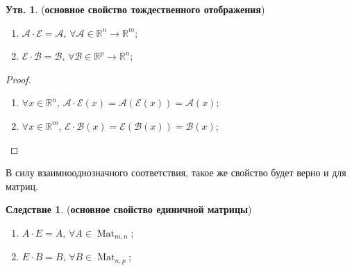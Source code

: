 \documentclass[12pt]{article}
\newcommand{\MR}{\mathbb{R}}
\newcommand{\MA}{\mathcal{A}}
\newcommand{\MCB}{\mathcal{B}}
\newcommand{\MCE}{\mathcal{E}}
\theoremstyle{definition}
\newtheorem{prop}{Утв.}
\newtheorem{corollary}{Следствие}
\newcommand{\mat}[2]{\operatorname{Mat}_{#1, #2}}
\begin{document}
\begin{prop}(\textbf{основное свойство тождественного отображения})
	\begin{enumerate}[label=\arabic*)]
		\item $\MA{\cdot}\MCE = \MA, \, \forall \MA \in \MR^n \to \MR^m $;
		\item $\MCE {\cdot}\MCB = \MCB, \, \forall \MCB \in \MR^p \to \MR^n $;
	\end{enumerate}
\end{prop}
\begin{proof}\hfill
	\begin{enumerate}[label=\arabic*)]
		\item $\forall x \in \MR^n, \, \MA{\cdot}\MCE(x) = \MA(\MCE(x)) = \MA(x)$;
		\item $\forall x \in \MR^m, \, \MCE{\cdot}\MCB(x) = \MCE(\MCB(x)) = \MCB(x)$;
	\end{enumerate}
\end{proof}
В силу взаимнооднозначного соответствия, такое же свойство будет верно и для матриц.
\newpage
\begin{corollary}(\textbf{основное свойство единичной матрицы})
	\begin{enumerate}[label=\arabic*)]
		\item $A{\cdot}E = A, \, \forall A \in \mat{m}{n} $;
		\item $E {\cdot}B = B, \, \forall B \in \mat{n}{p} $;
	\end{enumerate}
\end{corollary}
\end{document}
